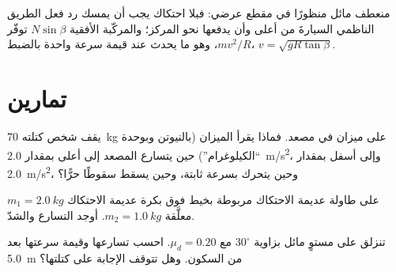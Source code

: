 \begin{omfigure}

{\small منعطف مائل منظورًا في مقطع عرضي: فبلا احتكاك يجب أن يمسك
رد فعل الطريق الناظمي السيارةَ من أعلى وأن يدفعها نحو
المركز؛ والمركّبة الأفقية $N\sin\beta$ توفّر $mv^2/R$،
وهو ما يحدث عند قيمة سرعة واحدة بالضبط، $v = \sqrt{gR\tan\beta}$.}
\end{omfigure}

\section{تمارين}

\begin{exercise}[$\star$]\label{exo:b1:newton-dynamics:1}
يقف شخص كتلته \qty{70}{kg} على ميزان في مصعد. فماذا
يقرأ الميزان (بالنيوتن وبوحدة ``الكيلوغرام'') حين يتسارع المصعد
إلى أعلى بمقدار \qty{2.0}{m/s^2}، وإلى أسفل بمقدار \qty{2.0}{m/s^2}،
وحين يتحرك بسرعة ثابتة، وحين يسقط سقوطًا حرًّا؟
\end{exercise}

\begin{exercise}[$\star$]\label{exo:b1:newton-dynamics:2}
 $m_1 = \qty{2.0}{kg}$ على طاولة عديمة الاحتكاك مربوطة بخيط
فوق بكرة عديمة الاحتكاك  معلَّقة $m_2 = \qty{1.0}{kg}$.
أوجد التسارع والشدّ.
\end{exercise}

\begin{exercise}[$\star$]\label{exo:b1:newton-dynamics:3}
 تنزلق على مستوٍ مائل بزاوية $30^\circ$ مع $\mu_d = 0.20$. احسب
تسارعها وقيمة سرعتها بعد \qty{5.0}{m} من السكون. وهل تتوقف
الإجابة على كتلتها؟
\end{exercise}

